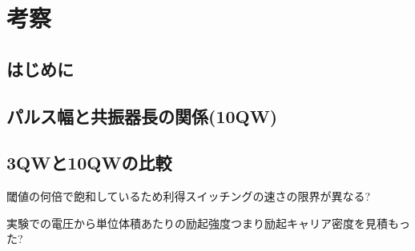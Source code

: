 \chapter{考察}
\label{chap:simulation}

\section{はじめに}

\section{パルス幅と共振器長の関係(10QW)}
\section{3QWと10QWの比較}
閾値の何倍で飽和しているため利得スイッチングの速さの限界が異なる?

実験での電圧から単位体積あたりの励起強度つまり励起キャリア密度を見積もった?
